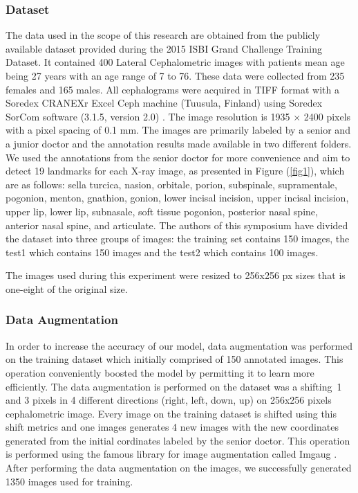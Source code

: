 \documentclass{elektr}
\begin{document}



\subsubsection{Dataset}
\tab The data used in the scope of this research are obtained from the publicly available dataset provided during the 2015 ISBI Grand Challenge Training Dataset. It contained 400 Lateral Cephalometric images with patients mean age being 27 years with an age range of 7 to 76. These data were collected from 235 females and 165 males. All cephalograms were acquired in TIFF format with a Soredex CRANEXr Excel Ceph machine (Tuusula, Finland) using Soredex SorCom software (3.1.5, version 2.0) \cite{ref8}. The image resolution is 1935 $ \times $  2400 pixels with a pixel spacing of 0.1 mm. The images are primarily labeled by a senior and a junior doctor and the annotation results made available in two different folders. We used the annotations from the senior doctor for more convenience and aim to detect 19 landmarks for each X-ray image, as presented in Figure (\ref{fig1}), which are as follows: sella turcica, nasion, orbitale, porion, subspinale, supramentale, pogonion, menton, gnathion, gonion, lower incisal incision, upper incisal incision, upper lip, lower lip, subnasale, soft tissue pogonion, posterior nasal spine, anterior nasal spine, and articulate. The authors of this symposium have divided the dataset into three groups of images: the training set contains 150 images, the test1 which contains 150 images and the test2 which contains 100 images. 

The images used during this experiment were resized to 256x256 px sizes that is one-eight of the original size. 

\subsubsection{Data Augmentation}
\label{DataAugmentation}
\tab In order to increase the accuracy of our model, data augmentation was performed on the training dataset which initially comprised of 150 annotated images. This operation conveniently boosted the model by permitting it to learn more efficiently. The data augmentation is performed on the dataset was a shifting\  1 and 3 pixels in 4 different directions (right, left, down, up) on 256x256 pixels cephalometric image. Every image on the training dataset is shifted using this shift metrics and one images generates 4 new images with the new coordinates generated from the initial cordinates labeled by the senior doctor. This operation is performed using the famous library for image augmentation called Imgaug \cite{ref9}. After performing the data augmentation on the images, we successfully generated 1350 images used for training. 
\end{document}
